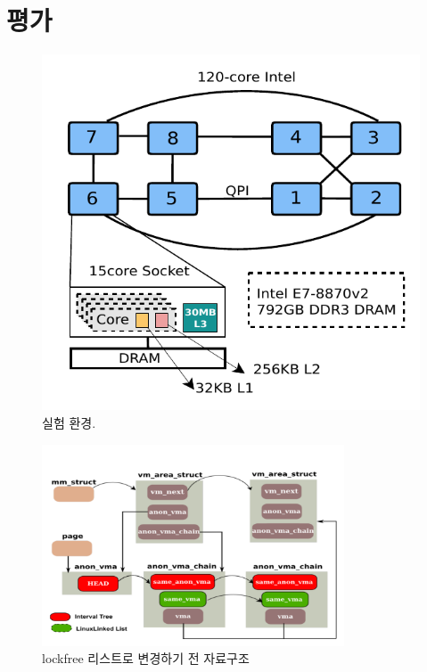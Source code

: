 \newpage

\section{평가}
\label{sec:evaluation}
\begin{figure}[h!]
  \begin{center}
    \includegraphics[scale=0.8]{fig/xeon}
  \end{center}
  \caption{실험 환경.}
  \label{fig:xeon}
\end{figure}
 
 \begin{figure}[h]
    \centering
    \includegraphics[width=0.8\textwidth]{fig/lockfree}
    \caption{lockfree 리스트로 변경하기 전 자료구조}
  \label{fig:lockfree}
\end{figure}
 
